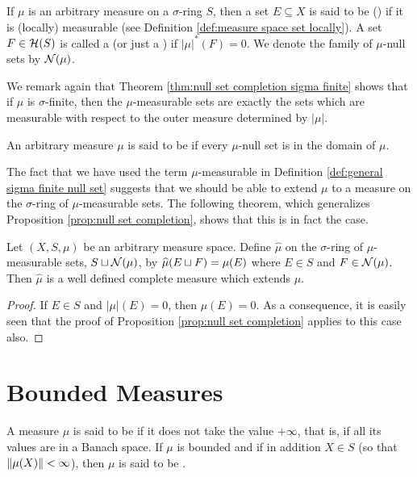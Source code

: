 \begin{definition}\label{def:general sigma finite null set}
If $\mu$ is an arbitrary measure on a $\sigma$-ring $S$, then a set $E\subseteq X$ is said to be ()  if it is (locally) measurable (see Definition \ref{def:measure space set locally}). A set $F\in{\cal H}(S)$ is called a  (or just a ) if $|\mu|^*(F)=0$. We denote the family of $\mu$-null sets by ${\cal N}(\mu)$.
\end{definition}

We remark again that Theorem \ref{thm:null set completion sigma finite} shows that if $\mu$ is $\sigma$-finite, then the $\mu$-measurable sets are exactly the sets which are measurable with respect to the outer measure determined by $|\mu|$.

\begin{definition}
An arbitrary measure $\mu$ is said to be  if every $\mu$-null set is in the domain of $\mu$.
\end{definition}

The fact that we have used the term $\mu$-measurable in Definition \ref{def:general sigma finite null set} suggests that we should be able to extend $\mu$ to a measure on the $\sigma$-ring of $\mu$-measurable sets. The following theorem, which generalizes Proposition \ref{prop:null set completion}, shows that this is in fact the case.

\begin{theorem}\label{thm:completion of general measure}
Let $(X,S,\mu)$ be an arbitrary measure space. Define $\widehat{\mu}$ on the $\sigma$-ring of $\mu$-measurable sets, $S\sqcup{\cal N}(\mu)$, by $\widehat{\mu}(E\sqcup F)=\mu(E)$ where $E\in S$ and $F\in{\cal N}(\mu)$. Then $\widehat{\mu}$ is a well defined complete measure which extends $\mu$.
\end{theorem}

\begin{proof}
If $E\in S$ and $|\mu|(E)=0$, then $\mu(E)=0$. As a consequence, it is easily seen that the proof of Proposition \ref{prop:null set completion} applies to this case also.
\end{proof}

\section{Bounded Measures}
\begin{definition}
A measure $\mu$ is said to be  if it does not take the value $+\infty$, that is, if all its values are in a Banach space. If $\mu$ is bounded and if in addition $X\in S$ (so that $\norm{\mu(X)}<\infty$), then $\mu$ is said to be .
\end{definition}


